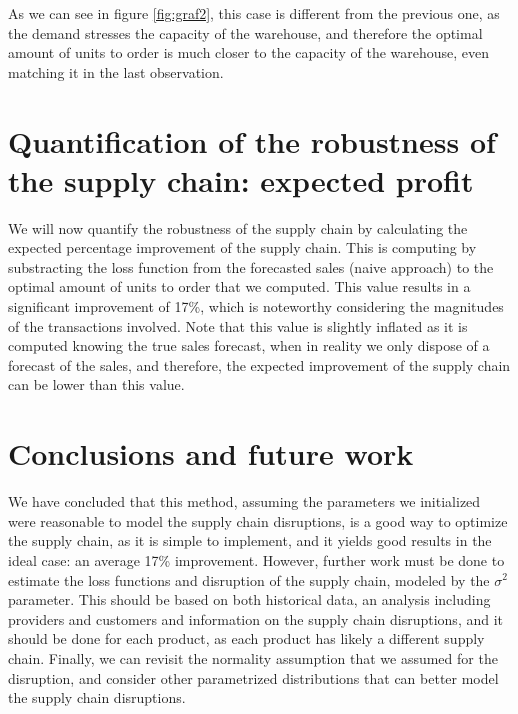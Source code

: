 \documentclass{OptiFlow}
\begin{document}
As we can see in figure \ref{fig:graf2}, this case is different from the previous one, as the demand stresses the capacity of the warehouse,
and therefore the optimal amount of units to order is much closer to the capacity of the warehouse, even matching it in the last observation.

\section{Quantification of the robustness of the supply chain: expected profit}
We will now quantify the robustness of the supply chain by calculating the expected percentage improvement of the supply chain.
This is computing by substracting the loss function from the forecasted sales (naive approach) to the optimal amount of units to order that we computed.
This value results in a significant improvement of 17\%, which is noteworthy considering the magnitudes of the transactions involved.
Note that this value is slightly inflated as it is computed knowing the true sales forecast, when in reality
we only dispose of a forecast of the sales, and therefore, the expected improvement of the supply chain can be lower than this value.


\section{Conclusions and future work}
We have concluded that this method, assuming the parameters we initialized were reasonable to model the supply chain disruptions,
is a good way to optimize the supply chain, as it is simple to implement, and it yields good results in the ideal case: an average 17\% improvement.
However, further work must be done to estimate the loss functions and disruption of the supply chain,
modeled by the $\sigma^2$ parameter. This should be based on both historical data, an analysis including providers and customers
and information on the supply chain disruptions, and it should be done for each product, as each product has likely a different supply chain.
Finally, we can revisit the normality assumption that we assumed for the disruption, and consider other parametrized
distributions that can better model the supply chain disruptions.
\end{document}
